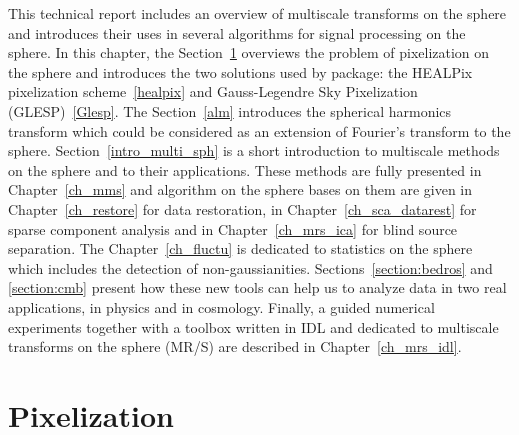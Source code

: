 This technical report includes an overview of multiscale transforms on the sphere and introduces their uses in several algorithms 
for signal processing on the sphere. In this chapter, the Section~\ref{mrs_pixel} overviews the problem of pixelization on the sphere 
and introduces the two solutions used by \mrs package: the HEALPix pixelization scheme~\ref{healpix} and Gauss-Legendre Sky Pixelization (GLESP)~\ref{Glesp}. 
The Section~\ref{alm} introduces the spherical harmonics transform which could be considered as an extension of Fourier's transform to the sphere. 
Section~\ref{intro_multi_sph} is a short introduction to multiscale methods on the sphere and to their applications. These methods are fully 
presented in Chapter~\ref{ch_mms} and algorithm on the sphere bases on them are given in Chapter~\ref{ch_restore} for data restoration, 
in Chapter~\ref{ch_sca_datarest} for sparse component analysis and in Chapter~\ref{ch_mrs_ica} for blind source separation. 
The Chapter~\ref{ch_fluctu} is dedicated to statistics on the sphere which includes the detection of non-gaussianities.
Sections~\ref{section:bedros} and \ref{section:cmb} present how these new tools can help us to analyze data in two 
real applications, in physics and in cosmology. Finally, a guided numerical experiments together with a toolbox 
written in IDL and dedicated to multiscale transforms on the sphere (MR/S) are described in Chapter~\ref{ch_mrs_idl}.


\section{Pixelization}
\label{mrs_pixel}

